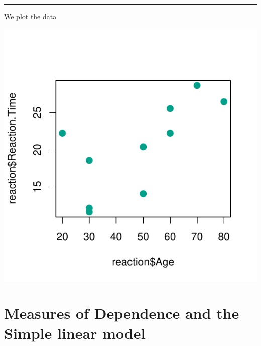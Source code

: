 \documentclass[]{article}
\newenvironment{Shaded}{\begin{snugshade}}{\end{snugshade}}
\newcommand{\DataTypeTok}[1]{\textcolor[rgb]{0.13,0.29,0.53}{#1}}
\newcommand{\DecValTok}[1]{\textcolor[rgb]{0.00,0.00,0.81}{#1}}
\newcommand{\KeywordTok}[1]{\textcolor[rgb]{0.13,0.29,0.53}{\textbf{#1}}}
\newcommand{\NormalTok}[1]{#1}
\newcommand{\OperatorTok}[1]{\textcolor[rgb]{0.81,0.36,0.00}{\textbf{#1}}}
\begin{document}
\begin{center}\rule{0.5\linewidth}{\linethickness}\end{center}

We plot the data

\begin{Shaded}
\end{Shaded}

\begin{center}\includegraphics{inference_booklet_files/figure-latex/unnamed-chunk-3-1} \end{center}

\hypertarget{measures-of-dependence-and-the-simple-linear-model}{%
\section{Measures of Dependence and the Simple linear
model}\label{measures-of-dependence-and-the-simple-linear-model}}
\end{document}
